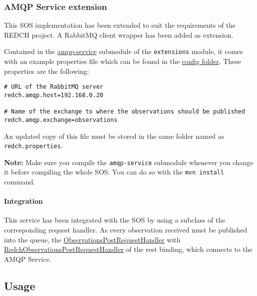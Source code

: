 \subsubsection*{AMQP Service extension}\label{amqp-service-extension}

This SOS implementation has been extended to suit the requirements of
the REDCH project. A RabbitMQ client wrapper has been added as
extension.

Contained in the
\href{https://github.com/sauloperez/sos/tree/master/src/extensions/amqp-service}{amqp-service}
submodule of the \texttt{extensions} module, it comes with an example
properties file which can be found in the
\href{https://github.com/sauloperez/sos/tree/master/config}{config
folder}. These properties are the following:

\begin{verbatim}
# URL of the RabbitMQ server
redch.amqp.host=192.168.0.20

# Name of the exchange to where the observations should be published
redch.amqp.exchange=observations
\end{verbatim}

An updated copy of this file must be stored in the same folder named as
\texttt{redch.properties}.

\textbf{Note:} Make sure you compile the \texttt{amqp-service} submodule
whenever you change it before compiling the whole SOS. You can do so
with the \texttt{mvn install} command.

\paragraph{Integration}\label{integration}

This service has been integrated with the SOS by using a subclass of the
corresponding request handler. As every observation received must be
published into the queue, the
\href{https://github.com/sauloperez/sos/blob/master/src/bindings/rest/code/src/main/java/org/n52/sos/binding/rest/resources/observations/ObservationsPostRequestHandler.java}{ObservationsPostRequestHandler}
with
\href{https://github.com/sauloperez/sos/blob/mastero/src/bindings/rest/code/src/main/java/org/n52/sos/binding/rest/resources/observations/RedchObservationsPostRequestHandler.java}{RedchObservationsPostRequestHandler}
of the rest binding, which connects to the AMQP Service.

\subsection*{Usage}\label{usage}

